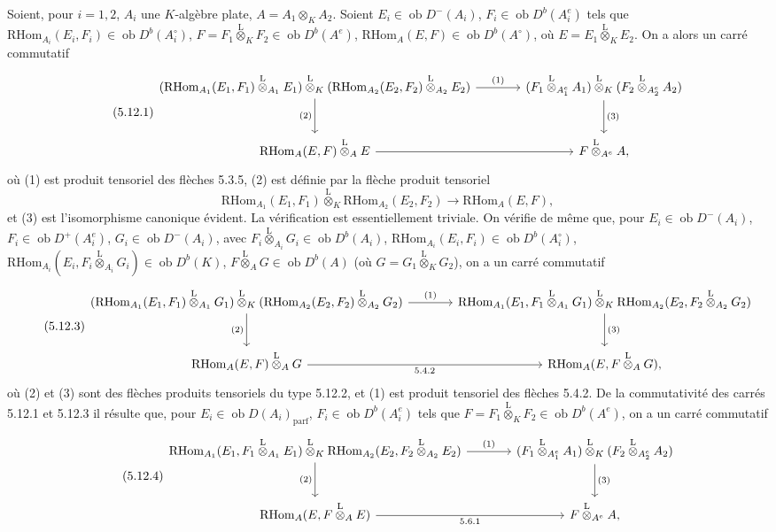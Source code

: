 \documentclass[11pt]{article}
\newcommand{\ob}{\operatorname{ob}}
\providecommand{\RHom}{\mathrm{RHom}}
\providecommand{\lten}{\overset{\mathrm L}{\otimes}}
\providecommand{\RHom}{\mathrm{RHom}}
\providecommand{\ob}{\operatorname{ob}}
\providecommand{\lten}{\overset{\mathrm L}{\otimes}}
\providecommand{\RHom}{\mathrm R\mathcal{H}om}
\providecommand{\lten}{\overset{\mathrm L}{\otimes}}
\providecommand{\lten}{\overset{\mathrm L}{\otimes}}
\providecommand{\lten}{\overset{\mathrm L}{\otimes}}
\providecommand{\lten}{\overset{\mathrm L}{\otimes}}
\providecommand{\RHom}{\mathrm{RHom}}
\providecommand{\lten}{\overset{\mathrm L}{\otimes}}
\begin{document}
Soient, pour $i=1,2$, $A_i$ une $K$-algèbre plate, $A=A_1\otimes_KA_2$. Soient $E_i\in\ob D^-(A_i)$, $F_i\in\ob D^b(A_i^e)$ tels que $\RHom_{A_i}(E_i,F_i)\in\ob D^b(A_i^\circ)$, $F=F_1\lten_KF_2\in\ob D^b(A^e)$, $\RHom_A(E,F)\in\ob D^b(A^\circ)$, où $E=E_1\lten_KE_2$. On a alors un carré commutatif
\begin{equation}\tag{5.12.1}
\begin{tikzcd}[column sep=large,row sep=large]
(\RHom_{A_1}(E_1,F_1)\lten_{A_1}E_1)\lten_K(\RHom_{A_2}(E_2,F_2)\lten_{A_2}E_2) \arrow[r,"(1)"] \arrow[d,"(2)"'] & (F_1\lten_{A_1^e}A_1)\lten_K(F_2\lten_{A_2^e}A_2) \arrow[d,"(3)"]\\
\RHom_A(E,F)\lten_AE \arrow[r] & F\lten_{A^e}A,
\end{tikzcd}
\end{equation}
où (1) est produit tensoriel des flèches 5.3.5, (2) est définie par la flèche produit tensoriel
\begin{equation}\tag{5.12.2}
\RHom_{A_1}(E_1,F_1)\lten_K\RHom_{A_2}(E_2,F_2)\longrightarrow\RHom_A(E,F),
\end{equation}
et (3) est l'isomorphisme canonique évident. La vérification est essentiellement triviale. On vérifie de même que, pour $E_i\in\ob D^-(A_i)$, $F_i\in\ob D^+(A_i^e)$, $G_i\in\ob D^-(A_i)$, avec $F_i\lten_{A_i}G_i\in\ob D^b(A_i)$, $\RHom_{A_i}(E_i,F_i)\in\ob D^b(A_i^\circ)$, $\RHom_{A_i}(E_i,F_i\lten_{A_i}G_i)\in\ob D^b(K)$, $F\lten_AG\in\ob D^b(A)$ (où $G=G_1\lten_KG_2$), on a un carré commutatif
\begin{equation}\tag{5.12.3}
\begin{tikzcd}[column sep=large,row sep=large]
(\RHom_{A_1}(E_1,F_1)\lten_{A_1}G_1)\lten_K(\RHom_{A_2}(E_2,F_2)\lten_{A_2}G_2) \arrow[r,"(1)"] \arrow[d,"(2)"'] & \RHom_{A_1}(E_1,F_1\lten_{A_1}G_1)\lten_K\RHom_{A_2}(E_2,F_2\lten_{A_2}G_2) \arrow[d,"(3)"]\\
\RHom_A(E,F)\lten_AG \arrow[r,"5.4.2"'] & \RHom_A(E,F\lten_AG),
\end{tikzcd}
\end{equation}
où (2) et (3) sont des flèches produits tensoriels du type 5.12.2, et (1) est produit tensoriel des flèches 5.4.2. De la commutativité des carrés 5.12.1 et 5.12.3 il résulte que, pour $E_i\in\ob D(A_i)_{\mathrm{parf}}$, $F_i\in\ob D^b(A_i^e)$ tels que $F=F_1\lten_KF_2\in\ob D^b(A^e)$, on a un carré commutatif
\begin{equation}\tag{5.12.4}
\begin{tikzcd}[column sep=large,row sep=large]
\RHom_{A_1}(E_1,F_1\lten_{A_1}E_1)\lten_K\RHom_{A_2}(E_2,F_2\lten_{A_2}E_2) \arrow[r,"(1)"] \arrow[d,"(2)"'] & (F_1\lten_{A_1^e}A_1)\lten_K(F_2\lten_{A_2^e}A_2) \arrow[d,"(3)"]\\
\RHom_A(E,F\lten_AE) \arrow[r,"5.6.1"'] & F\lten_{A^e}A,
\end{tikzcd}
\end{equation}
\end{document}
